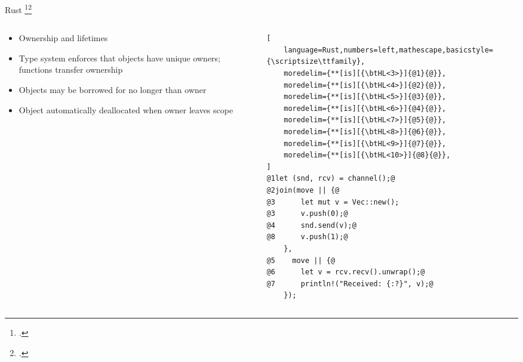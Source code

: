 \documentclass[aspectratio=169]{beamer}
\begin{document}
\begin{frame}[fragile]{Rust \footcite{matsakis_rust_2014}\footcite{jung_rustbelt:_2017}}
    \begin{columns}
    \begin{column}{0.46\textwidth}

    \begin{itemize}
        \item Ownership and lifetimes 
        \item Type system enforces that objects have unique \alert{owners}; functions transfer ownership 
        \item Objects may be borrowed for no longer than owner 
        \item Object automatically \alert{deallocated} when owner leaves scope
    \end{itemize}

    \end{column}

    \pause

    \begin{column}{0.52\textwidth}
\begin{lstlisting}[
    language=Rust,numbers=left,mathescape,basicstyle={\scriptsize\ttfamily},
    moredelim={**[is][{\btHL<3>}]{@1}{@}},
    moredelim={**[is][{\btHL<4>}]{@2}{@}},
    moredelim={**[is][{\btHL<5>}]{@3}{@}},
    moredelim={**[is][{\btHL<6>}]{@4}{@}},
    moredelim={**[is][{\btHL<7>}]{@5}{@}},
    moredelim={**[is][{\btHL<8>}]{@6}{@}},
    moredelim={**[is][{\btHL<9>}]{@7}{@}},
    moredelim={**[is][{\btHL<10>}]{@8}{@}},
]
@1let (snd, rcv) = channel();@
@2join(move || {@
@3      let mut v = Vec::new();
@3      v.push(0);@
@4      snd.send(v);@
@8      v.push(1);@
    },
@5    move || {@
@6      let v = rcv.recv().unwrap();@
@7      println!("Received: {:?}", v);@
    });
\end{lstlisting}
\end{column}
\end{columns}

\end{frame}
\end{document}
